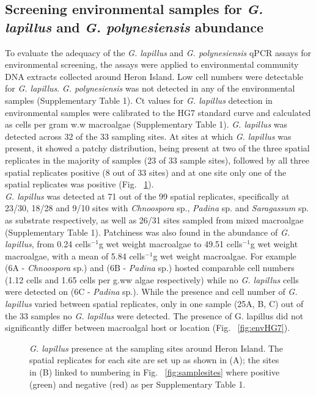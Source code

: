 \documentclass[12pt]{article}
\begin{document}
\subsection*{Screening environmental samples for \emph{G. lapillus} and \emph{G. polynesiensis} abundance}
To evaluate the adequacy of the \emph{G. lapillus} and \emph{G. polynesiensis} qPCR assays for environmental screening, the assays were applied to environmental community DNA extracts collected around Heron Island. Low cell numbers were detectable for \emph{G. lapillus}. \emph{G. polynesiensis} was not detected in any of the environmental samples (Supplementary Table 1).
Ct values for \emph{G. lapillus} detection in environmental samples were calibrated to the HG7 standard curve and calculated as cells per gram w.w macroalgae (Supplementary Table 1). 
\emph{G. lapillus} was detected across 32 of the 33 sampling sites. At sites at which \textit{G. lapillus} was present, it showed a patchy distribution, being present at two of the three spatial replicates in the majority of samples (23 of 33 sample sites), followed by all three spatial replicates positive (8 out of 33 sites) and at one site only one of the spatial replicates was positive (Fig. ~\ref{fig:envposneg}). \\
\emph{G. lapillus} was detected at 71 out of the 99 spatial replicates, specifically at 23/30, 18/28 and 9/10 sites with \emph{Chnoospora} sp., \emph{Padina} sp. and \emph{Saragassum} sp. as substrate respectively, as well as 26/31 sites sampled from mixed macroalgae (Supplementary Table 1).
Patchiness was also found in the abundance of 
\emph{G. lapillus}, from 0.24 cells$^{-1}$g wet weight macroalgae to 49.51 cells$^{-1}$g wet weight macroalgae, with a mean of 5.84 cells$^{-1}$g wet weight macroalgae. For example (6A - \emph{Chnoospora} sp.) and (6B - \emph{Padina} sp.) hosted comparable cell numbers (1.12 cells and 1.65 cells per g.ww algae respectively) while no \emph{G. lapillus} cells were detected on (6C - \emph{Padina} sp.). While the presence and cell number of \emph{G. lapillus} varied between spatial replicates, only in one sample (25A, B, C) out of the 33 samples no \emph{G. lapillus} were detected. The presence of G. lapillus did not significantly differ between macroalgal host or location (Fig. ~\ref{fig:envHG7}). 

\FloatBarrier 
\begin{figure} 
\caption{\emph{G. lapillus} presence at the sampling sites around Heron Island. The spatial replicates for each site are set up as shown in (A); the sites in (B) linked to numbering in Fig. ~\ref{fig:samplesites} where positive (green) and negative (red) as per Supplementary Table 1.} 
\label{fig:envposneg}
\end{figure} 
\FloatBarrier
\end{document}
